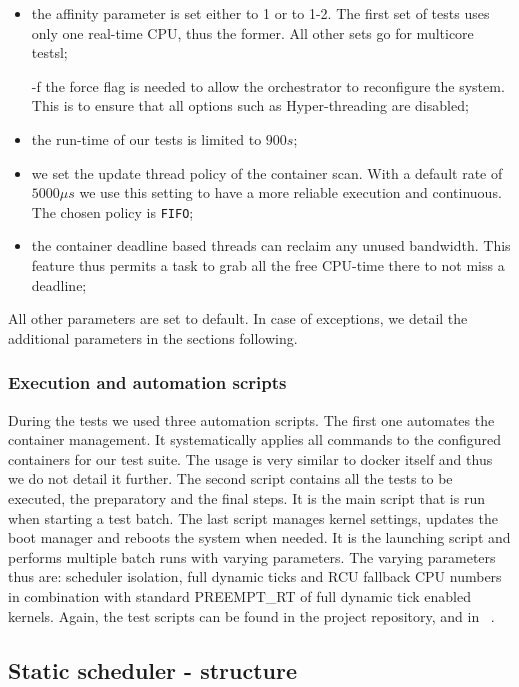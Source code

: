 \documentclass[]{scrartcl}
\begin{document}
\begin{itemize} %
	\item the affinity parameter is set either to 1 or to 1-2. The first set of tests uses only one real-time CPU, thus the former. All other sets go for multicore testsl;
	\item[-f] the force flag is needed to allow the orchestrator to reconfigure the system. This is to ensure that all options such as Hyper-threading are disabled;
	\item the run-time of our tests is limited to $900s$;
	\item we set the update thread policy of the container scan. With a default rate of $5000\mu s$ we use this setting to have a more reliable execution and continuous. The chosen policy is \texttt{FIFO};
	\item the container deadline based threads can reclaim any unused bandwidth. This feature thus permits a task to grab all the free CPU-time there to not miss a deadline;
\end{itemize}

All other parameters are set to default. 
In case of exceptions, we detail the additional parameters in the sections following.

\subsubsection{Execution and automation scripts}
\label{sub:scripts}

During the tests we used three automation scripts. 
The first one automates the container management. It systematically applies all commands to the configured containers for our test suite. The usage is very similar to docker itself and thus we do not detail it further.
The second script contains all the tests to be executed, the preparatory and the final steps.
It is the main script that is run when starting a test batch.
The last script manages kernel settings, updates the boot manager and reboots the system when needed. It is the launching script and performs multiple batch runs with varying parameters. 
The varying parameters thus are: scheduler isolation, full dynamic ticks and RCU fallback CPU numbers in combination with standard PREEMPT\_RT of full dynamic tick enabled kernels. 
%
Again, the test scripts can be found in the project repository, and in ~\cite{homep01}.

\subsection{Static scheduler - structure}
\end{document}
